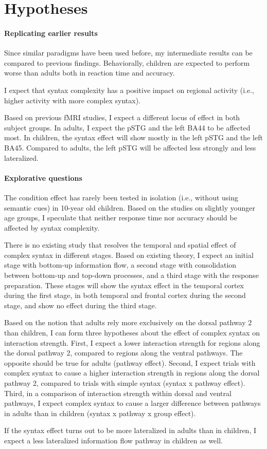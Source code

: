 \section{Hypotheses}

\paragraph{Replicating earlier results}
Since similar paradigms have been used before, my intermediate results can be compared to previous findings.
Behaviorally, children are expected to perform worse than adults both in reaction time and accuracy.

I expect that syntax complexity has a positive impact on regional activity (i.e., higher activity with more complex syntax).

Based on previous fMRI studies, I expect a different locus of effect in both subject groups.
In adults, I expect the pSTG and the left BA44 to be affected most.
In children, the syntax effect will show mostly in the left pSTG and the left BA45.
Compared to adults, the left pSTG will be affected less strongly and less lateralized.

\paragraph{Explorative questions}
The condition effect has rarely been tested in isolation (i.e., without using semantic cues) in 10-year old children.
Based on the studies on slightly younger age groups, I speculate that neither response time nor accuracy should be affected by syntax complexity.

There is no existing study that resolves the temporal and spatial effect of complex syntax in different stages.
Based on existing theory, I expect an initial stage with bottom-up information flow, a second stage with consolidation between bottom-up and top-down processes, and a third stage with the response preparation.
These stages will show the syntax effect in the temporal cortex during the first stage, in both temporal and frontal cortex during the second stage, and show no effect during the third stage.

Based on the notion that adults rely more exclusively on the dorsal pathway 2 than children, I can form three hypotheses about the effect of complex syntax on interaction strength.
First, I expect a lower interaction strength for regions along the dorsal pathway 2, compared to regions along the ventral pathways. The opposite should be true for adults (pathway effect).
Second, I expect trials with complex syntax to cause a higher interaction strength in regions along the dorsal pathway 2, compared to trials with simple syntax (syntax x pathway effect).
Third, in a comparison of interaction strength within dorsal and ventral pathways, I expect complex syntax to cause a larger difference between pathways in adults than in children (syntax x pathway x group effect).

If the syntax effect turns out to be more lateralized in adults than in children, I expect a less lateralized information flow pathway in children as well.